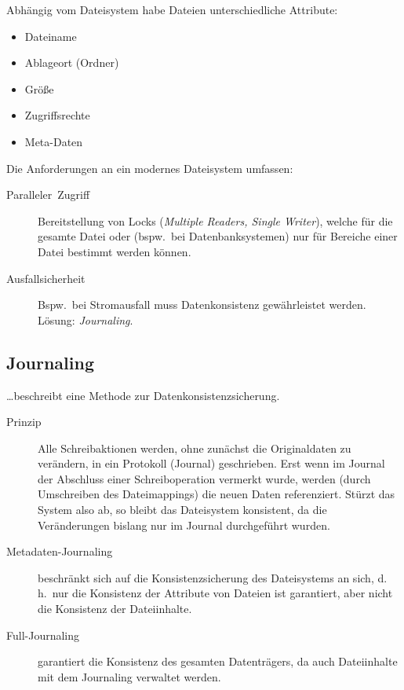 Abhängig vom Dateisystem habe Dateien unterschiedliche Attribute:
\begin{itemize}
  \item Dateiname
  \item Ablageort (Ordner)
  \item Größe
  \item Zugriffsrechte
  \item Meta-Daten
\end{itemize}
Die Anforderungen an ein modernes Dateisystem umfassen:
\begin{description}
  \item [{Paralleler~Zugriff}]
	Bereitstellung von Locks (\foreignlanguage{english}{\emph{Multiple Readers, Single Writer}}), welche für die gesamte Datei oder (bspw.~bei Datenbanksystemen) nur für Bereiche einer Datei bestimmt werden können.
  \item [{Ausfallsicherheit}]
	Bspw.~bei Stromausfall muss Datenkonsistenz gewährleistet werden. Lösung: \foreignlanguage{english}{\emph{Journaling}}.
\end{description}

\subsection{\label{sub:Journaling}Journaling}

\ldots{}beschreibt eine Methode zur Datenkonsistenzsicherung.
\begin{description}
  \item [{Prinzip}]
	Alle Schreibaktionen werden, ohne zunächst die Originaldaten zu verändern, in ein Protokoll (\foreignlanguage{english}{Journal}) geschrieben.
	Erst wenn im Journal der Abschluss einer Schreiboperation vermerkt wurde, werden (durch Umschreiben des Dateimappings) die neuen Daten referenziert.
	Stürzt das System also ab, so bleibt das Dateisystem konsistent, da die Ver\-än\-der\-ung\-en bislang nur im Journal durchgeführt wurden.
  \item [{Metadaten-Journaling}] 
	beschränkt sich auf die Konsistenzsicherung des Dateisystems an sich, d.\,h.~nur die Konsistenz der Attribute von Dateien ist garantiert, aber nicht die Konsistenz der Dateiinhalte.
  \item [{Full-Journaling}] 
	garantiert die Konsistenz des gesamten Datenträgers, da auch Dateiinhalte mit dem \foreignlanguage{english}{Journaling} verwaltet werden.
\end{description}

